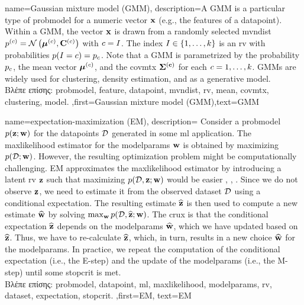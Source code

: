 {name={Gaussian mixture model (GMM)}, 
	description={A GMM 
		is a particular type of \gls{probmodel} for a numeric vector ${\bf x}$ (e.g., 
		the \gls{feature}s of a \gls{datapoint}). Within a GMM, the vector ${\bf x}$ is drawn from a randomly 
		selected \gls{mvndist} $p^{(c)} = \mathcal{N}\left({\bm \mu}^{(c)},\mathbf{C}^{(c)}\right)$ with 
		$c = I$. The index $I \in \{1,\ldots,k\}$ is an \gls{rv} with probabilities $p({I=c}) = p_{c}$.
	     	Note that a GMM is parametrized by the \gls{probability} $p_{c}$, the 
		\gls{mean} vector ${\bm \mu}^{(c)}$, and the \gls{covmtx} $\bf\Sigma^{(c)}$ for each $c=1,\ldots,k$. 
		GMMs are widely used for \gls{clustering}, density estimation, and as a generative \gls{model}.\\
		\foreignlanguage{greek}{Βλέπε επίσης:} \gls{probmodel}, \gls{feature}, \gls{datapoint}, \gls{mvndist}, \gls{rv}, \gls{mean}, \gls{covmtx}, \gls{clustering}, \gls{model}.
	 },first={Gaussian mixture model (GMM)},text={GMM} }
	 
{name={expectation-maximization (EM)}, 
	description={ 
		Consider a \gls{probmodel} $p({{\bf z}; {\bf w}})$ for the \gls{datapoint}s $\mathcal{D}$ generated in some 
		\gls{ml} application. The \gls{maxlikelihood} estimator for the \gls{modelparams} ${\bf w}$ is obtained by maximizing 
		$p({\mathcal{D}; {\bf w}})$. However, the resulting optimization problem might be computationally 
		challenging. EM approximates the \gls{maxlikelihood} estimator by introducing a latent 
		\gls{rv} ${\bf z}$ such that maximizing $p({\mathcal{D},{\bf z}; {\bf w}})$ would be easier \cite{hastie01statisticallearning}, \cite{BishopBook}, \cite{GraphModExpFamVarInfWainJor}. Since we 
		do not observe ${\bf z}$, we need to estimate it from the observed \gls{dataset} $\mathcal{D}$ 
		using a conditional \gls{expectation}. The resulting estimate $\widehat{{\bf z}}$ is then used to 
		compute a new estimate $\widehat{{\bf w}}$ by solving $\max_{{\bf w}} p({\mathcal{D}, \widehat{{\bf z}}; {\bf w}})$. 
		The crux is that the conditional \gls{expectation} $\widehat{{\bf z}}$ depends on the \gls{modelparams} $\widehat{{\bf w}}$, 
		which we have updated based on $\widehat{{\bf z}}$. Thus, we have to re-calculate $\widehat{{\bf z}}$, 
		which, in turn, results in a new choice $\widehat{{\bf w}}$ for the \gls{modelparams}. In practice, 
		we repeat the computation of the conditional \gls{expectation} (i.e., the E-step) and the update 
		of the \gls{modelparams} (i.e., the M-step) until some \gls{stopcrit} is met.\\
		\foreignlanguage{greek}{Βλέπε επίσης:} \gls{probmodel}, \gls{datapoint}, \gls{ml}, \gls{maxlikelihood}, \gls{modelparams}, \gls{rv}, \gls{dataset}, \gls{expectation}, \gls{stopcrit}.
  },first={EM},
  text={EM}
}

